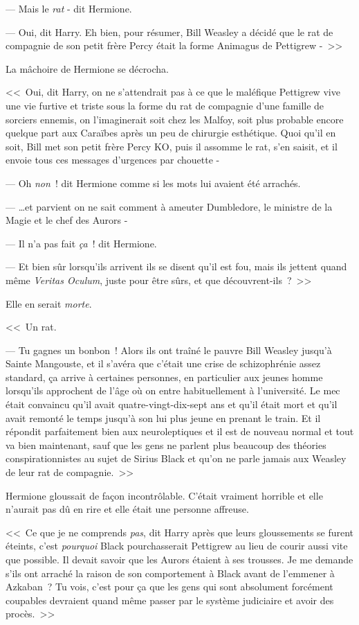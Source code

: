 --- Mais le \emph{rat} - dit Hermione.

--- Oui, dit Harry. Eh bien, pour résumer, Bill Weasley a décidé que le rat de compagnie de son petit frère Percy était la forme Animagus de Pettigrew -~>>

La mâchoire de Hermione se décrocha.

<<~Oui, dit Harry, on ne s'attendrait pas à ce que le maléfique Pettigrew vive une vie furtive et triste sous la forme du rat de compagnie d'une famille de sorciers ennemis, on l'imaginerait soit chez les Malfoy, soit plus probable encore quelque part aux Caraïbes après un peu de chirurgie esthétique. Quoi qu'il en soit, Bill met son petit frère Percy KO, puis il assomme le rat, s'en saisit, et il envoie tous ces messages d'urgences par chouette -

--- Oh \emph{non}~! dit Hermione comme si les mots lui avaient été arrachés.

--- …et parvient on ne sait comment à ameuter Dumbledore, le ministre de la Magie et le chef des Aurors -

--- Il n'a pas fait \emph{ça}~! dit Hermione.

--- Et bien sûr lorsqu'ils arrivent ils se disent qu'il est fou, mais ils jettent quand même \emph{Veritas Oculum}, juste pour être sûrs, et que découvrent-ils~?~>>

Elle en serait \emph{morte}.

<<~Un rat.

--- Tu gagnes un bonbon~! Alors ils ont traîné le pauvre Bill Weasley jusqu'à Sainte Mangouste, et il s'avéra que c'était une crise de schizophrénie assez standard, ça arrive à certaines personnes, en particulier aux jeunes homme lorsqu'ils approchent de l'âge où on entre habituellement à l'université. Le mec était convaincu qu'il avait quatre-vingt-dix-sept ans et qu'il était mort et qu'il avait remonté le temps jusqu'à son lui plus jeune en prenant le train. Et il répondit parfaitement bien aux neuroleptiques et il est de nouveau normal et tout va bien maintenant, sauf que les gens ne parlent plus beaucoup des théories conspirationnistes au sujet de Sirius Black et qu'on ne parle jamais aux Weasley de leur rat de compagnie.~>>

Hermione gloussait de façon incontrôlable. C'était vraiment horrible et elle n'aurait pas dû en rire et elle était une personne affreuse.

<<~Ce que je ne comprends \emph{pas}, dit Harry après que leurs gloussements se furent éteints, c'est \emph{pourquoi} Black pourchasserait Pettigrew au lieu de courir aussi vite que possible. Il devait savoir que les Aurors étaient à ses trousses. Je me demande s'ils ont arraché la raison de son comportement à Black avant de l'emmener à Azkaban~? Tu vois, c'est pour ça que les gens qui sont absolument forcément coupables devraient quand même passer par le système judiciaire et avoir des procès.~>>

